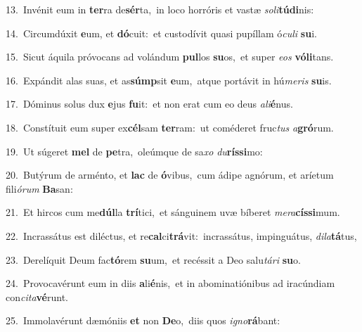 {\numbfont\textcolor{\numbcolor}{13.}}~Invénit eum in \textbf{ter}\-ra de\-\textbf{sér}\-ta,~\star in loco horróris et vastæ \textit{so}\-\textit{li}\textbf{tú}\textbf{di}nis:\par
{\numbfont\textcolor{\numbcolor}{14.}}~Circumdúxit \textbf{e}\-um, et \textbf{dó}\-cuit:~\star et custodívit quasi pupíllam ó\-\textit{cu}\-\textit{li} \textbf{su}\-i.\par
{\numbfont\textcolor{\numbcolor}{15.}}~Sicut áquila próvocans ad volándum \textbf{pul}\-los \textbf{su}\-os,~\star et super \textit{e}\-\textit{os} \textbf{vó}\-\textbf{li}tans.\par
{\numbfont\textcolor{\numbcolor}{16.}}~Expándit alas suas, et as\-\textbf{súmp}\-sit \textbf{e}\-um,~\star atque portávit in hú\-\textit{me}\-\textit{ris} \textbf{su}\-is.\par
{\numbfont\textcolor{\numbcolor}{17.}}~Dóminus solus dux \textbf{e}\-jus \textbf{fu}\-it:~\star et non erat cum eo deus \textit{a}\-\textit{li}\textbf{é}nus.\par
{\numbfont\textcolor{\numbcolor}{18.}}~Constítuit eum super ex\-\textbf{cél}\-sam \textbf{ter}\-ram:~\star ut coméderet fruc\textit{tus} \textit{a}\-\textbf{gró}rum.\par
{\numbfont\textcolor{\numbcolor}{19.}}~Ut súgeret \textbf{mel} de \textbf{pe}\-tra,~\star oleúmque de sa\textit{xo} \textit{du}\-\textbf{rís}\textbf{si}mo:\par
{\numbfont\textcolor{\numbcolor}{20.}}~Butýrum de arménto, et \textbf{lac} de \textbf{ó}\-vibus,~\star cum ádipe agnórum, et aríetum fili\-\textit{ó}\-\textit{rum} \textbf{Ba}\-san:\par
{\numbfont\textcolor{\numbcolor}{21.}}~Et hircos cum me\-\textbf{dúl}\-la \textbf{trí}\-tici,~\star et sánguinem uvæ bíberet \textit{me}\-\textit{ra}\textbf{cís}\textbf{si}mum.\par
{\numbfont\textcolor{\numbcolor}{22.}}~Incrassátus est diléctus, et re\-\textbf{cal}\-ci\-\textbf{trá}\-vit:~\star incrassátus, impinguátus, \textit{di}\-\textit{la}\textbf{tá}tus,\par
{\numbfont\textcolor{\numbcolor}{23.}}~Derelíquit Deum fac\-\textbf{tó}\-rem \textbf{su}\-um,~\star et recéssit a Deo salu\-\textit{tá}\-\textit{ri} \textbf{su}\-o.\par
{\numbfont\textcolor{\numbcolor}{24.}}~Provocavérunt eum in diis \textbf{a}\-li\-\textbf{é}\-nis,~\star et in abominatiónibus ad iracúndiam con\-\textit{ci}\-\textit{ta}\textbf{vé}runt.\par
{\numbfont\textcolor{\numbcolor}{25.}}~Immolavérunt dæmóniis \textbf{et} non \textbf{De}\-o,~\star diis quos \textit{i}\-\textit{gno}\textbf{rá}bant:\par
